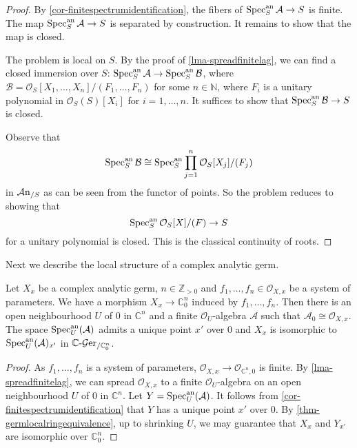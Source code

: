 \begin{proof}
    By \cref{cor-finitespectrumidentification}, the fibers of $\operatorname{Spec}^{\mathrm{an}}_S \mathcal{A}\rightarrow S$ is finite. The map $\operatorname{Spec}^{\mathrm{an}}_S \mathcal{A}\rightarrow S$ is separated by construction. It remains to show that the map is closed.

    The problem is local on $S$.
    By the proof of \cref{lma-spreadfinitelag}, we can find a closed immersion over $S$: $\operatorname{Spec}^{\mathrm{an}}_S \mathcal{A}\rightarrow \operatorname{Spec}^{\mathrm{an}}_S\mathcal{B}$, where $\mathcal{B}=\mathcal{O}_S[X_1,\ldots,X_n]/(F_1,\ldots,F_n)$ for some $n\in \mathbb{N}$, where $F_i$ is a unitary polynomial in $\mathcal{O}_S(S)[X_i]$ for $i=1,\ldots,n$. It suffices to show that $\operatorname{Spec}^{\mathrm{an}}_S \mathcal{B}\rightarrow S$ is closed.

    Observe that
    \[
        \operatorname{Spec}^{\mathrm{an}}_S \mathcal{B}\cong \operatorname{Spec}^{\mathrm{an}}_S \prod_{j=1}^n \mathcal{O}_S[X_j]/(F_j)
    \]
    in $\mathcal{A}\mathrm{n}_{/S}$ as can be seen from the functor of points. So the problem reduces to showing that 
    \[
        \operatorname{Spec}_S^{\mathrm{an}} \mathcal{O}_S[X]/(F)\rightarrow S  
    \]
    for a unitary polynomial is closed. This is the classical continuity of roots.
\end{proof}


Next we describe the local structure of a complex analytic germ.
\begin{thm}\label{thm-morphismdefinedbygeneratorlocal}
    Let $X_x$ be a complex analytic germ, $n\in \mathbb{Z}_{>0}$ and $f_1,\ldots,f_n\in \mathcal{O}_{X,x}$ be a system of parameters. We have a morphism $X_x\rightarrow \mathbb{C}^n_0$ induced by $f_1,\ldots,f_n$. Then there is an open neighbourhood $U$ of $0$ in $\mathbb{C}^n$ and a finite $\mathcal{O}_U$-algebra $\mathcal{A}$ such that $\mathcal{A}_0\cong \mathcal{O}_{X,x}$. The space $\operatorname{Spec}^{\mathrm{an}}_{U}(\mathcal{A})$ admits a unique point $x'$ over $0$ and $X_x$ is isomorphic to $\operatorname{Spec}^{\mathrm{an}}_{U}(\mathcal{A})_{x'}$ in $\mathbb{C}\text{-}\mathcal{G}\mathrm{er}_{/\mathbb{C}^n_0}$.
\end{thm}
\begin{proof}
    As $f_1,\ldots,f_n$ is a system of parameters, $\mathcal{O}_{X,x}\rightarrow \mathcal{O}_{\mathbb{C}^n,0}$ is finite. By \cref{lma-spreadfinitelag}, we can spread $\mathcal{O}_{X,x}$ to a finite $\mathcal{O}_U$-algebra on an open neighbourhood $U$ of $0$ in $\mathbb{C}^n$. Let $Y=\operatorname{Spec}^{\mathrm{an}}_{U}(\mathcal{A})$. 
    It follows from \cref{cor-finitespectrumidentification} that $Y$ has a unique point $x'$ over $0$. By \cref{thm-germlocalringequivalence}, up to shrinking $U$, we may guarantee that $X_x$ and $Y_{x'}$ are isomorphic over $\mathbb{C}^n_0$.
\end{proof}


